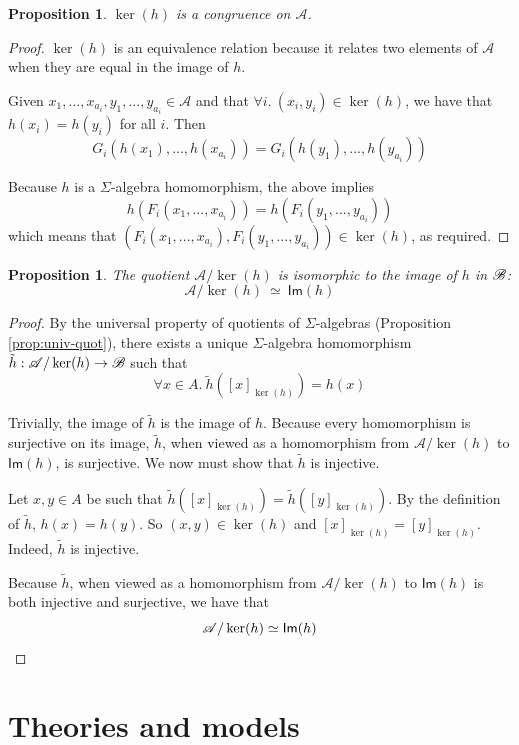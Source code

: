 \documentclass{msthesis}
\newtheorem{prop}[theorem]{Proposition}
\theoremstyle{definition}
\newcommand{\Amod}{\mathscr{A}}
\begin{document}
\begin{prop}
    $\ker(h)$ is a congruence on $\Amod$.
\end{prop}

\begin{proof}
    $\ker(h)$ is an equivalence relation because it relates two elements of $\Amod$ when they are equal in the image of $h$.

    Given $x_1, ..., x_{a_i}, y_1, ..., y_{a_i} \in \Amod$ and that $\forall i.\ (x_i, y_i) \in \ker(h)$, we have that $h(x_i) = h(y_i)$ for all $i$.  Then
    \[ G_i(h(x_1), ..., h(x_{a_i})) = G_i(h(y_1), ..., h(y_{a_i})) \]

    Because $h$ is a $\Sigma$-algebra homomorphism, the above implies
    \[ h(F_i(x_1, ..., x_{a_i})) = h(F_i(y_1, ..., y_{a_i})) \]
    which means that $(F_i(x_1, ..., x_{a_i}), F_i(y_1, ..., y_{a_i})) \in \ker(h)$, as required.
\end{proof}

\begin{prop}
The quotient $\Amod/\ker(h)$ is isomorphic to 
the image of $h$ in $\mathscr{B}$: \[ \Amod/\ker(h)~\simeq~\mathsf{Im}(h)\]
\end{prop}
\begin{proof}
    By the universal property of quotients of $\Sigma$-algebras (Proposition \ref{prop:univ-quot}), there exists a unique $\Sigma$-algebra homomorphism $\tilde{h} : \Amod/\ker(h) \to \Bmod$ such that
    \[ \forall x \in A.\ \tilde{h}([x]_{\ker(h)}) = h(x) \]
    
    Trivially, the image of $\tilde{h}$ is the image of $h$.  Because every homomorphism is surjective on its image, $\tilde{h}$, when viewed as a homomorphism from $\Amod/\ker(h)$ to $\mathsf{Im}(h)$, is surjective.  We now must show that $\tilde{h}$ is injective.  
    
    Let $x, y \in A$ be such that $\tilde{h}([x]_{\ker(h)}) = \tilde{h}([y]_{\ker(h)})$.  By the definition of $\tilde{h}$, $h(x) = h(y)$.
    So $(x, y) \in \ker(h)$ and $[x]_{\ker(h)} = [y]_{\ker(h)}$.  Indeed, $\tilde{h}$ is injective.

    Because $\tilde{h}$, when viewed as a homomorphism from $\Amod/\ker(h)$ to $\mathsf{Im}(h)$ is both injective and surjective, we have that
    \[ \Amod/\ker(h) \simeq \mathsf{Im}(h) \qedhere \]
\end{proof}


\section{Theories and models}
\end{document}
